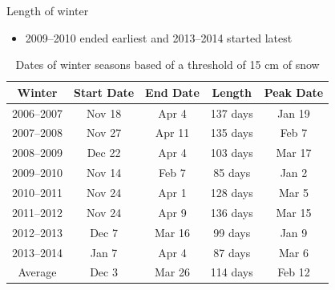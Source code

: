 \documentclass{beamer}
\begin{document}
\begin{frame}{Length of winter}

\begin{itemize}
\item 2009--2010 ended earliest and 2013--2014 started latest
\end{itemize}

\begin{table}[ht]
\begin{tabular}{c c c c c}
\hline
Winter & Start Date & End Date & Length & Peak Date \\ \hline
2006--2007 & Nov 18 & Apr 4 & 137 days & Jan 19  \\
2007--2008 & Nov 27 & Apr 11 & 135 days & Feb 7 \\
2008--2009 & Dec 22 & Apr 4 & 103 days & Mar 17 \\
2009--2010 & Nov 14 & Feb 7 & 85 days & Jan 2 \\
2010--2011 & Nov 24 & Apr 1 & 128 days & Mar 5 \\
2011--2012 & Nov 24 & Apr 9 & 136 days & Mar 15 \\
2012--2013 & Dec 7 & Mar 16 & 99 days & Jan 9 \\
2013--2014 & Jan 7 & Apr 4 & 87 days & Mar 6 \\ \hline
Average & Dec 3 & Mar 26 & 114 days & Feb 12 \\ \hline
\end{tabular}
\caption{Dates of winter seasons based of a threshold of 15 cm of snow}
\end{table}

\end{frame}
\end{document}
